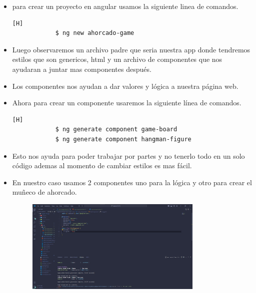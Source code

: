 \documentclass{article}
\begin{document}
\begin{itemize}
\begin{figure}[H]
		\end{figure}
		\item para crear un proyecto en angular usamos la siguiente linea de comandos.
		\begin{lstlisting}[language=bash,caption={Crear Proyecto en Angular}][H]
			$ ng new ahorcado-game
		\end{lstlisting}
		\item Luego observaremos un archivo padre que seria nuestra app donde tendremos estilos que son genericos, html y un archivo de componentes que nos ayudaran a juntar mas componentes después.
		\item Los componentes nos ayudan a dar valores y lógica a nuestra página web.
		\item Ahora para crear un componente usaremos la siguiente línea de comandos.
		\begin{lstlisting}[language=bash,caption={Crear Componentes}][H]
			$ ng generate component game-board
			$ ng generate component hangman-figure 
		\end{lstlisting}
		\item Esto nos ayuda para poder trabajar por partes y no tenerlo todo en un solo código ademas al momento de cambiar estilos es mas fácil.
		\item En nuestro caso usamos 2 componentes uno para la lógica y otro para crear el muñeco de ahorcado.
		\begin{figure}[H]
			\centering
			\includegraphics[width=0.8\textwidth,keepaspectratio]{img/creamosuncomponente.jpg}
	

\end{figure}
\end{itemize}
\end{document}
